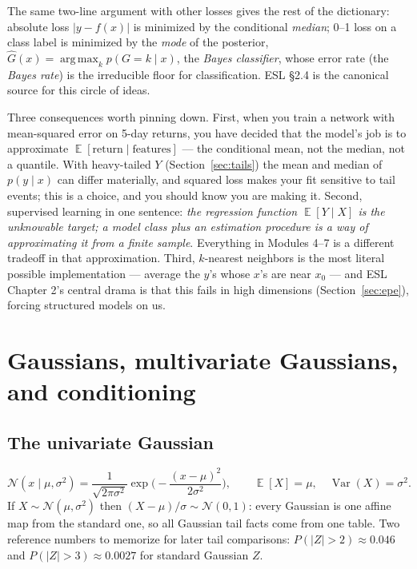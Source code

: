 \documentclass[11pt]{article}
\numberwithin{equation}{section}
\theoremstyle{plain}
\theoremstyle{definition}
\theoremstyle{remark}
\DeclareMathOperator{\E}{\mathbb{E}}
\DeclareMathOperator{\Var}{Var}
\DeclareMathOperator*{\argmax}{arg\,max}
\newcommand{\Normal}{\mathcal{N}}
\begin{document}
The same two-line argument with other losses gives the rest of the dictionary: absolute loss $|y - f(x)|$ is minimized by the conditional \emph{median}; 0--1 loss on a class label is minimized by the \emph{mode} of the posterior, $\hat{G}(x) = \argmax_k p(G = k \mid x)$, the \emph{Bayes classifier}, whose error rate (the \emph{Bayes rate}) is the irreducible floor for classification. ESL \S2.4 is the canonical source for this circle of ideas.

Three consequences worth pinning down. First, when you train a network with mean-squared error on 5-day returns, you have decided that the model's job is to approximate $\E[\text{return} \mid \text{features}]$ --- the conditional mean, not the median, not a quantile. With heavy-tailed $Y$ (Section~\ref{sec:tails}) the mean and median of $p(y\mid x)$ can differ materially, and squared loss makes your fit sensitive to tail events; this is a choice, and you should know you are making it. Second, supervised learning in one sentence: \emph{the regression function $\E[Y \mid X]$ is the unknowable target; a model class plus an estimation procedure is a way of approximating it from a finite sample}. Everything in Modules 4--7 is a different tradeoff in that approximation. Third, $k$-nearest neighbors is the most literal possible implementation --- average the $y$'s whose $x$'s are near $x_0$ --- and ESL Chapter 2's central drama is that this fails in high dimensions (Section~\ref{sec:epe}), forcing structured models on us.

\section{Gaussians, multivariate Gaussians, and conditioning}\label{sec:gauss}

\subsection{The univariate Gaussian}

\begin{equation}
\Normal(x \mid \mu, \sigma^2) = \frac{1}{\sqrt{2\pi\sigma^2}} \exp\!\Big(\!-\frac{(x-\mu)^2}{2\sigma^2}\Big),
\qquad \E[X] = \mu,\quad \Var(X) = \sigma^2 .
\end{equation}
If $X \sim \Normal(\mu,\sigma^2)$ then $(X-\mu)/\sigma \sim \Normal(0,1)$: every Gaussian is one affine map from the standard one, so all Gaussian tail facts come from one table. Two reference numbers to memorize for later tail comparisons: $P(|Z| > 2) \approx 0.046$ and $P(|Z| > 3) \approx 0.0027$ for standard Gaussian $Z$.
\end{document}
